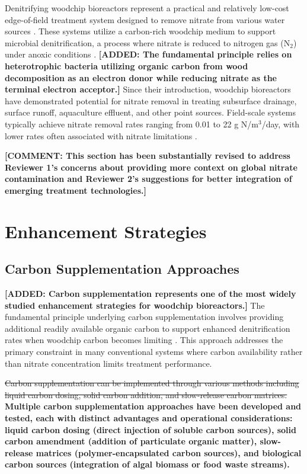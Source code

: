 \documentclass[12pt,a4paper]{article}
\newcommand{\added}[1]{\textcolor{addedtext}{\textbf{[ADDED: #1]}}}
\newcommand{\replaced}[2]{\textcolor{deletedtext}{\sout{#1}} \textcolor{replacedtext}{\textbf{#2}}}
\newcommand{\comment}[1]{\textcolor{commenttext}{\textbf{[COMMENT: #1]}}}
\begin{document}
Denitrifying woodchip bioreactors represent a practical and relatively low-cost edge-of-field treatment system designed to remove nitrate from various water sources \citep{RN625, RN310}. These systems utilize a carbon-rich woodchip medium to support microbial denitrification, a process where nitrate is reduced to nitrogen gas (N$_{2}$) under anoxic conditions \citep{RN242, RN629}. \added{The fundamental principle relies on heterotrophic bacteria utilizing organic carbon from wood decomposition as an electron donor while reducing nitrate as the terminal electron acceptor.} Since their introduction, woodchip bioreactors have demonstrated potential for nitrate removal in treating subsurface drainage, surface runoff, aquaculture effluent, and other point sources. Field-scale systems typically achieve nitrate removal rates ranging from 0.01 to 22 g N/m$^3$/day, with lower rates often associated with nitrate limitations \citep{RN625, RN310}.

\comment{This section has been substantially revised to address Reviewer 1's concerns about providing more context on global nitrate contamination and Reviewer 2's suggestions for better integration of emerging treatment technologies.}

\section{Enhancement Strategies}

\subsection{Carbon Supplementation Approaches}

\added{Carbon supplementation represents one of the most widely studied enhancement strategies for woodchip bioreactors.} The fundamental principle underlying carbon supplementation involves providing additional readily available organic carbon to support enhanced denitrification rates when woodchip carbon becomes limiting \citep{RN242, RN258}. This approach addresses the primary constraint in many conventional systems where carbon availability rather than nitrate concentration limits treatment performance.

\replaced{Carbon supplementation can be implemented through various methods including liquid carbon dosing, solid carbon addition, and slow-release carbon matrices.}{Multiple carbon supplementation approaches have been developed and tested, each with distinct advantages and operational considerations: liquid carbon dosing (direct injection of soluble carbon sources), solid carbon amendment (addition of particulate organic matter), slow-release matrices (polymer-encapsulated carbon sources), and biological carbon sources (integration of algal biomass or food waste streams).}
\end{document}
